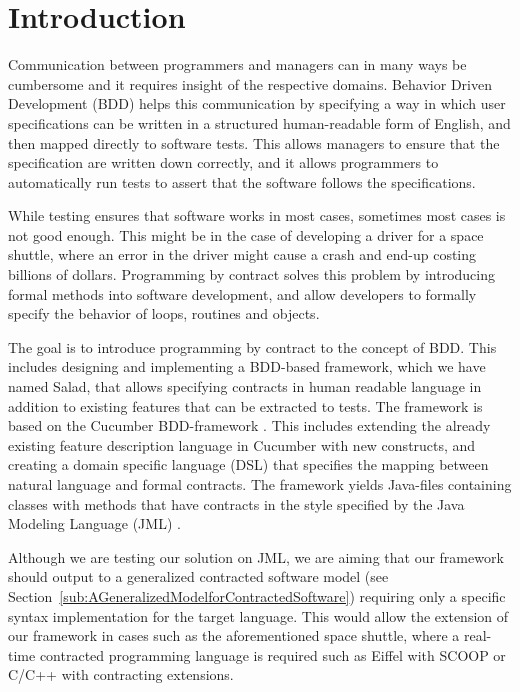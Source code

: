 \section{Introduction} %

Communication between programmers and managers can in many ways be cumbersome and it requires insight of the respective domains.
Behavior Driven Development (BDD) helps this communication by specifying a way in which user specifications can be written in a structured human-readable form of English, and then mapped directly to software tests.
This allows managers to ensure that the specification are written down correctly, and it allows programmers to automatically run tests to assert that the software follows the specifications. 

While testing ensures that software works in most cases, sometimes most cases is not good enough.
This might be in the case of developing a driver for a space shuttle, where an error in the driver might cause a crash and end-up costing billions of dollars.
Programming by contract \cite{meyer1992} solves this problem by introducing formal methods into software development, 
and allow developers to formally specify the behavior of loops, routines and objects.

The goal is to introduce programming by contract to the concept of BDD.
This includes designing and implementing a BDD-based framework, which we have named Salad, that allows specifying contracts in human readable language in addition to existing features that can be extracted to tests.
The framework is based on the Cucumber BDD-framework \cite{hellesoy2012}.
This includes extending the already existing feature description language in Cucumber with new constructs, and creating a domain specific language (DSL) that specifies the mapping between natural language and formal contracts.
The framework yields Java-files containing classes with methods that have contracts in the style specified by the Java Modeling Language (JML) \cite{leavens2006design}.

Although we are testing our solution on JML, we are aiming that our framework should output to a generalized contracted software model (see Section~\ref{sub:AGeneralizedModelforContractedSoftware}) requiring
only a specific syntax implementation for the target language. This would allow the extension of our framework in cases such as the aforementioned space shuttle,
where a real-time contracted programming language is required such as Eiffel with SCOOP\cite{eiffel2012scoop} or C/C++ with contracting extensions\cite{digitalmars2011contractprogramming}.

